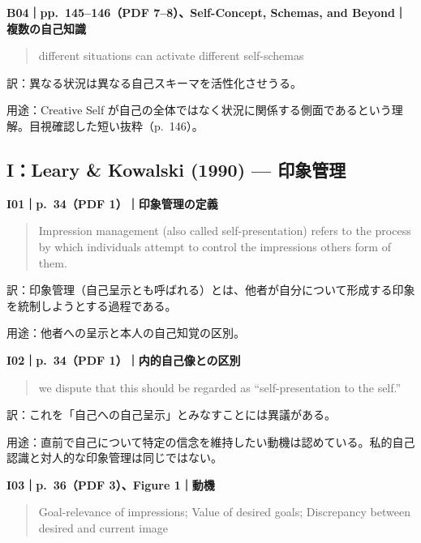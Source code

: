 \documentclass[
  11pt,
  a4paper,
]{article}
\begin{document}

\textbf{B04｜pp.~145--146（PDF 7--8）、Self-Concept, Schemas, and
Beyond｜複数の自己知識}

\begin{quote}
different situations can activate different self-schemas
\end{quote}

訳：異なる状況は異なる自己スキーマを活性化させうる。

用途：Creative Self
が自己の全体ではなく状況に関係する側面であるという理解。目視確認した短い抜粋（p.~146）。

\subsection{I：Leary \& Kowalski (1990) ---
印象管理}\label{ileary-kowalski-1990-ux5370ux8c61ux7ba1ux7406}


\textbf{I01｜p.~34（PDF 1）｜印象管理の定義}

\begin{quote}
Impression management (also called self-presentation) refers to the
process by which individuals attempt to control the impressions others
form of them.
\end{quote}

訳：印象管理（自己呈示とも呼ばれる）とは、他者が自分について形成する印象を統制しようとする過程である。

用途：他者への呈示と本人の自己知覚の区別。


\textbf{I02｜p.~34（PDF 1）｜内的自己像との区別}

\begin{quote}
we dispute that this should be regarded as ``self-presentation to the
self.''
\end{quote}

訳：これを「自己への自己呈示」とみなすことには異議がある。

用途：直前で自己について特定の信念を維持したい動機は認めている。私的自己認識と対人的な印象管理は同じではない。


\textbf{I03｜p.~36（PDF 3）、Figure 1｜動機}

\begin{quote}
Goal-relevance of impressions; Value of desired goals; Discrepancy
between desired and current image
\end{quote}
\end{document}

